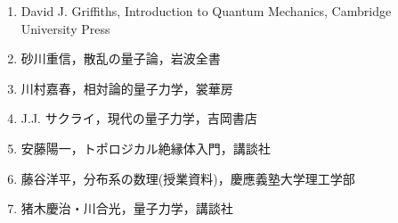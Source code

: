 \documentclass{report}
\begin{document}
  \begin{enumerate}
    \item David J. Griffiths, Introduction to Quantum Mechanics, Cambridge University Press
    \item 砂川重信，散乱の量子論，岩波全書
    \item 川村嘉春，相対論的量子力学，裳華房
    \item J.J. サクライ，現代の量子力学，吉岡書店
    \item 安藤陽一，トポロジカル絶縁体入門，講談社
    \item 藤谷洋平，分布系の数理(授業資料)，慶應義塾大学理工学部
    \item 猪木慶治・川合光，量子力学，講談社
  \end{enumerate}
\end{document}
